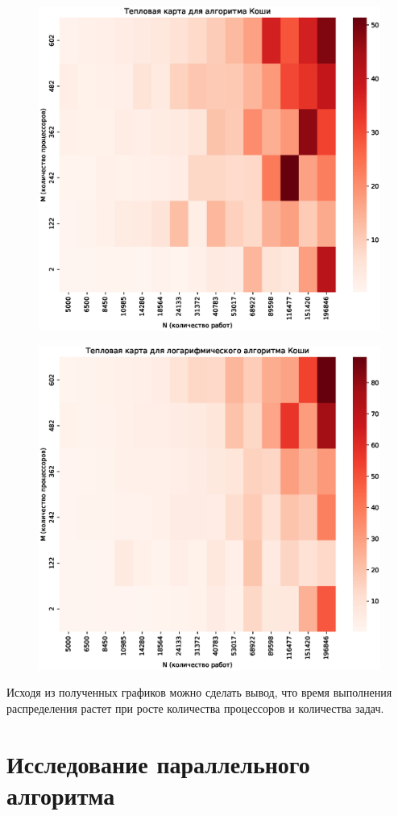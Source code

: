 \documentclass[openany, twoside, a4paper, 12pt]{extbook}
\begin{document}
	\begin{figure}[h]
	    \centering
	    \includegraphics[width=\textwidth]{cauchy_heatmap.eps}
	    \label{fig:cauchy}
	\end{figure}
	
	\begin{figure}[h]
	    \centering
	    \includegraphics[width=\textwidth]{log_cauchy_heatmap.eps}
	    \label{fig:log_cauchy}
	\end{figure}

	Исходя из полученных графиков можно сделать вывод, что время выполнения распределения
	растет при росте количества процессоров и количества задач.

	\section*{Исследование параллельного алгоритма}
\end{document}
